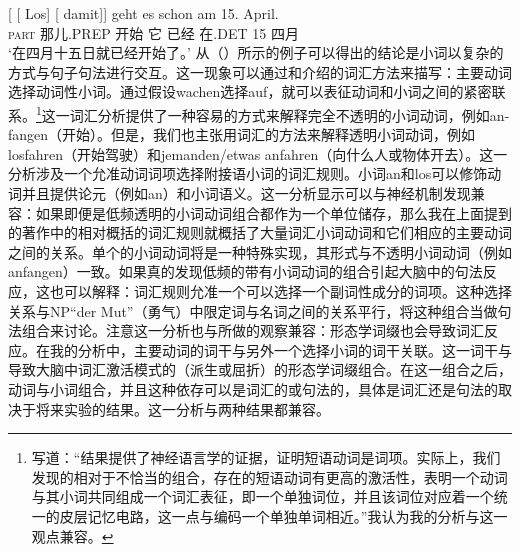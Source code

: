 \begin{exe}
\begin{xlist}[iv.]
\begin{exe}
\begin{xlist}[iv.]
\ex
\gll {}[ [ Los]        [ damit]]    geht es schon   am 15. April.\footnotemark\\
       {}        {}        \textsc{part}  {}        那儿.PREP 开始 它 已经 在.DET 15 四月\\%
%
\glt `在四月十五日就已经开始了。'
\zl
从（）所示的例子可以得出的结论是小词以复杂的方式与句子句法进行交互。这一现象可以通过和介绍的词汇方法来描写：主要动词选择动词性小词。通过假设wachen选择auf，就可以表征动词和小词之间的紧密联系。\footnote{
  \citet[]{CSP2010a}写道：“结果提供了神经语言学的证据，证明短语动词是词项。实际上，我们发现的相对于不恰当的组合，存在的短语动词有更高的激活性，表明一个动词与其小词共同组成一个词汇表征，即一个单独词位，并且该词位对应着一个统一的皮层记忆电路，这一点与编码一个单独单词相近。”我认为我的分析与这一观点兼容。
}这一词汇分析提供了一种容易的方式来解释完全不透明的小词动词，例如an-fangen（开始）。但是，我们也主张用词汇的方法来解释透明小词动词，例如losfahren（开始驾驶）和jemanden/etwas anfahren（向什么人或物体开去）。这一分析涉及一个允准动词词项选择附接语小词的词汇规则。小词an和los可以修饰动词并且提供论元（例如an）和小词语义。这一分析显示可以与神经机制发现兼容：如果即便是低频透明的小词动词组合都作为一个单位储存，那么我在上面提到的著作中的相对概括的词汇规则就概括了大量词汇小词动词和它们相应的主要动词之间的关系。单个的小词动词将是一种特殊实现，其形式与不透明小词动词（例如anfangen）一致。如果真的发现低频的带有小词动词的组合引起大脑中的句法反应，这也可以解释：词汇规则允准一个可以选择一个副词性成分的词项。这种选择关系与NP“der Mut”（勇气）中限定词与名词之间的关系平行，\citet[]{CSP2010a}将这种组合当做句法组合来讨论。注意这一分析也与\citet*{SPP2005a-u}所做的观察兼容：形态学词缀也会导致词汇反应。在我的分析中，主要动词的词干与另外一个选择小词的词干关联。这一词干与导致大脑中词汇激活模式的（派生或屈折）的形态学词缀组合。在这一组合之后，动词与小词组合，并且这种依存可以是词汇的或句法的，具体是词汇还是句法的取决于将来实验的结果。这一分析与两种结果都兼容。

\end{xlist}
\end{exe}
\end{xlist}
\end{exe}
